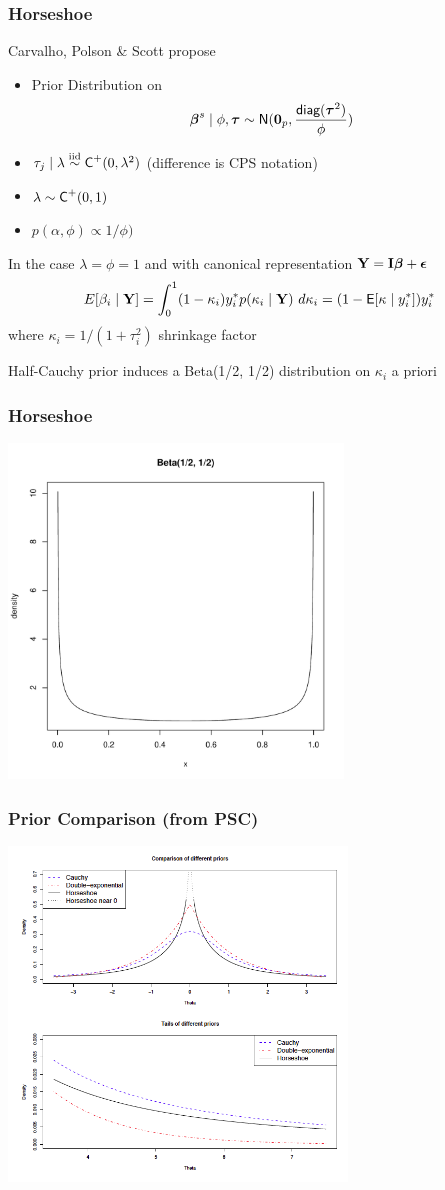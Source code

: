 \documentclass[handout]{beamer}
\begin{document}
\begin{frame}
  \frametitle{Horseshoe}
  Carvalho, Polson \& Scott  propose
\begin{itemize}
\item 
Prior Distribution on $$\boldsymbol{\beta}^s \mid \phi, \boldsymbol{\tau} \sim \textsf{N}(\mathbf{0}_p, \frac{\textsf{diag}(\boldsymbol{\tau}^2)}{ \phi
    }) $$ \pause
\item $\tau_j \mid \lambda \mathrel{\mathop{\sim}\limits^{\rm iid}} \textsf{C}^+(0, \lambda^2)$   (difference is CPS notation) \pause
\item $\lambda \sim \textsf{C}^+(0, 1)$ \pause
\item $p(\alpha, \phi) \propto 1/\phi)$ \pause
\end{itemize}

In the case $\lambda = \phi = 1$ and with canonical representation $\mathbf{Y} =
\mathbf{I} \boldsymbol{\beta} + \boldsymbol{\epsilon}$ \pause
$$ 
E[\beta_i \mid \mathbf{Y}] = \int_0^1 (1 - \kappa_i) y^*_i p(\kappa_i \mid \mathbf{Y})
\ d\kappa_i = (1 - \textsf{E}[\kappa \mid y^*_i]) y^*_i$$
where $\kappa_i = 1/(1 + \tau_i^2)$ shrinkage factor \pause

\vspace{18pt}
Half-Cauchy prior induces a Beta(1/2, 1/2) distribution on $\kappa_i$
a priori
\end{frame}
\begin{frame}
\frametitle{Horseshoe}
  \includegraphics[height=3.5in]{beta}
\end{frame}

\begin{frame}
\frametitle{Prior Comparison (from PSC)}
  \includegraphics[height=3.5in]{densities}
\end{frame}
\end{document}
